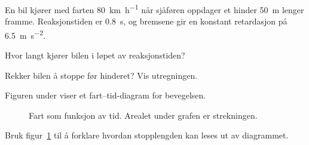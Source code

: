 \documentclass[12pt]{article}
\begin{document}
%
\clearpage
{}


\begin{oppgave}
En bil kjører med farten \qty{80}{\kilo\metre\per\hour} når sjåføren oppdager et hinder \qty{50}{\metre} lenger framme. Reaksjonstiden er \qty{0.8}{\second}, og bremsene gir en konstant retardasjon på \qty{6.5}{\metre\per\second\squared}.

\begin{deloppgaver}
  \item Hvor langt kjører bilen i løpet av reaksjonstiden?
  \item Rekker bilen å stoppe før hinderet? Vis utregningen.
\end{deloppgaver}

Figuren under viser et fart--tid-diagram for bevegelsen.

\begin{figure}[ht]
  \centering
  \caption{Fart som funksjon av tid. Arealet under grafen er
           strekningen.}
  \label{fig:vt}
\end{figure}

\begin{deloppgaver}[resume]
  \item Bruk figur~\ref{fig:vt} til å forklare hvordan stopplengden kan leses ut av diagrammet.
\end{deloppgaver}
\end{oppgave}
\end{document}
